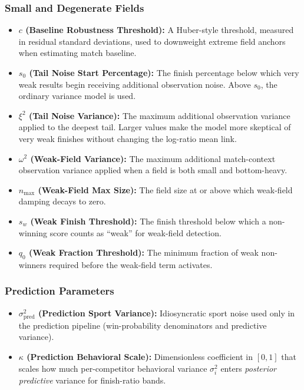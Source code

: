 \documentclass[12pt]{article}
\begin{document}
	\subsubsection*{Small and Degenerate Fields}
	\begin{itemize}
		\item \textbf{$c$ (Baseline Robustness Threshold):} A Huber-style threshold, measured in residual standard deviations, used to downweight extreme field anchors when estimating match baseline.
		\item \textbf{$s_0$ (Tail Noise Start Percentage):} The finish percentage below which very weak results begin receiving additional observation noise. Above $s_0$, the ordinary variance model is used.
		\item \textbf{$\xi^2$ (Tail Noise Variance):} The maximum additional observation variance applied to the deepest tail. Larger values make the model more skeptical of very weak finishes without changing the log-ratio mean link.
		\item \textbf{$\omega^2$ (Weak-Field Variance):} The maximum additional match-context observation variance applied when a field is both small and bottom-heavy.
		\item \textbf{$n_{\mathrm{max}}$ (Weak-Field Max Size):} The field size at or above which weak-field damping decays to zero.
		\item \textbf{$s_w$ (Weak Finish Threshold):} The finish threshold below which a non-winning score counts as ``weak'' for weak-field detection.
		\item \textbf{$q_0$ (Weak Fraction Threshold):} The minimum fraction of weak non-winners required before the weak-field term activates.
	\end{itemize}

	\subsubsection*{Prediction Parameters}
	\begin{itemize}
		\item \textbf{$\sigma_{\mathrm{pred}}^2$ (Prediction Sport Variance):} Idiosyncratic sport noise used only in the prediction pipeline (win-probability denominators and predictive variance).
		\item \textbf{$\kappa$ (Prediction Behavioral Scale):} Dimensionless coefficient in $[0,1]$ that scales how much per-competitor behavioral variance $\sigma_i^2$ enters \emph{posterior predictive} variance for finish-ratio bands.
	\end{itemize}
\end{document}
